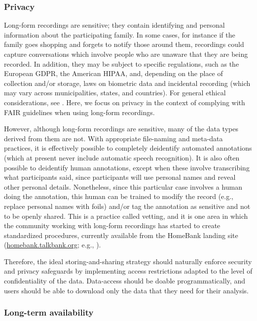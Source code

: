 \documentclass[smallextended]{svjour3}       %
\begin{document}
\subsubsection*{Privacy}

Long-form recordings are sensitive; they contain identifying and personal information about the participating family. In some cases, for instance if the family goes shopping and forgets to notify those around them, recordings could capture conversations which involve people who are unaware that they are being recorded. In addition, they may be subject to specific regulations, such as the European GDPR, the American HIPAA, and, depending on the place of collection and/or storage, laws on biometric data and incidental recording (which may vary across municipalities, states, and countries). For general ethical considerations, see \citet{Cychosz2020}. Here, we focus on privacy in the context of complying with FAIR guidelines when using long-form recordings.

However, although  long-form recordings are sensitive, many of the data types derived from them are not. With appropriate file-naming and meta-data practices, it is effectively possible to completely deidentify automated annotations (which at present never include automatic speech recognition). It is also often possible to deidentify human annotations, except when these involve transcribing what participants said, since participants will use personal names and reveal other personal details. Nonetheless, since this particular case involves a human doing the annotation, this human can be trained to modify the record (e.g., replace personal names with foils) and/or tag the annotation as sensitive and not to be openly shared. This is a practice called vetting, and it is one area in which the community working with long-form recordings has started to create standardized procedures, currently available from the HomeBank landing site (\url{homebank.talkbank.org}; e.g., \citealt{vandam2018vetting}).

Therefore, the ideal storing-and-sharing strategy should naturally enforce security and privacy safeguards by implementing access restrictions adapted to the level of confidentiality of the data. Data-access should be doable programmatically, and users should be able to download only the data that they need for their analysis.

\subsubsection*{Long-term availability}
\end{document}
